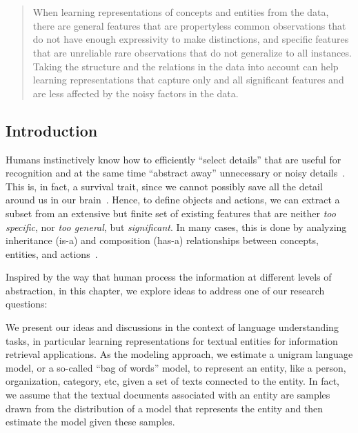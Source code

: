 \chapter{}
\label{chap:2}
%
\begin{quote}
When learning representations of concepts and entities from the data, there are general features that are propertyless common observations that do not have enough expressivity to make distinctions, and specific features that are unreliable rare observations that do not generalize to all instances. Taking the structure and the relations in the data into account can help learning representations that capture only and all significant features and are less affected by the noisy factors in the data.
\end{quote}
%
\section{Introduction}
Humans instinctively know how to efficiently ``select details'' that are useful for recognition and at the same time ``abstract away'' unnecessary or noisy details~\cite{tenenbaum2011grow, gentner1997structure, battaglia2018relational}. 
This is, in fact, a survival trait, since we cannot possibly save all the detail around us in our brain~\citep{timpf1999abstraction}. Hence, to define objects and actions, we can extract a subset from an extensive but finite set of existing features that are neither \emph{too specific}, nor \emph{too general}, but \emph{significant}. In many cases, this is done by analyzing inheritance (is-a) and composition (has-a) relationships between concepts, entities, and actions~\citep{goodwin2005reasoning, botvinick2008hierarchical}. 

Inspired by the way that human process the information at different levels of abstraction, in this chapter, we explore ideas to address one of our research questions:

We present our ideas and discussions in the context of language understanding tasks, in particular learning representations for textual entities for information retrieval applications. As the modeling approach, we estimate a unigram language model, or a so-called  ``bag of words'' model, to represent an entity, like a person, organization, category, etc, given a set of texts connected to the entity.  In fact, we assume that the textual documents associated with an entity are samples drawn from the distribution of a model that represents the entity and then estimate the model given these samples.

